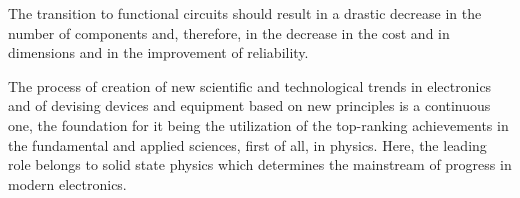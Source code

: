 The transition to functional circuits should result in a drastic decrease in the number of components and, therefore, in the decrease in the cost and in dimensions and in the improvement of reliability.

The process of creation of new scientific and technological trends in electronics and of devising devices and equipment based on new principles is a continuous one, the foundation for it being the utilization of the top-ranking achievements in the fundamental and applied sciences, first of all, in physics. Here, the leading role belongs to solid state physics which determines the mainstream of progress in modern electronics.
